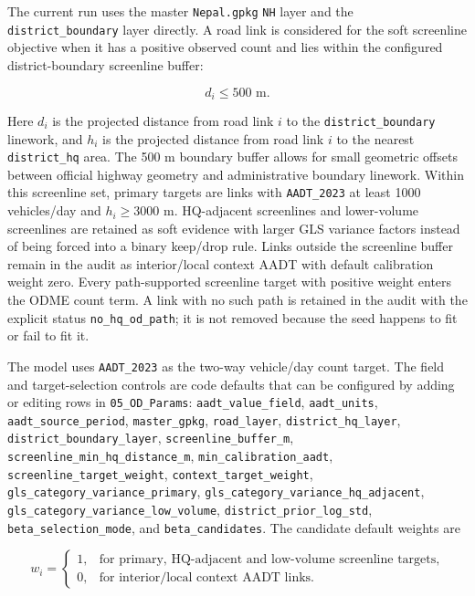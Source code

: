 \documentclass[11pt,a4paper]{article}
\begin{document}
The current run uses the master \texttt{Nepal.gpkg} \texttt{NH} layer and the
\texttt{district\_boundary} layer directly. A road link is considered for the
soft screenline objective when it has a positive observed count and lies within
the configured district-boundary screenline buffer:

\begin{equation}
d_i \leq 500\text{ m}.
\end{equation}

Here $d_i$ is the projected distance from road link $i$ to the
\texttt{district\_boundary} linework, and $h_i$ is the projected distance from
road link $i$ to the nearest \texttt{district\_hq} area. The 500 m boundary
buffer allows for small geometric offsets between official highway geometry and
administrative boundary linework. Within this screenline set, primary targets
are links with \texttt{AADT\_2023} at least 1000 vehicles/day and $h_i\geq3000$
m. HQ-adjacent screenlines and lower-volume screenlines are retained as soft
evidence with larger GLS variance factors instead of being forced into a binary
keep/drop rule. Links outside the screenline buffer remain in the audit as
interior/local context AADT with default calibration weight zero. Every
path-supported screenline target with positive weight enters the ODME count
term. A link with no such path is retained in the audit with the explicit status
\texttt{no\_hq\_od\_path}; it is not removed because the seed happens to fit
or fail to fit it.

The model uses \texttt{AADT\_2023} as the two-way vehicle/day count target.
The field and target-selection controls are code defaults that can be configured
by adding or editing rows in \texttt{05\_OD\_Params}:
\texttt{aadt\_value\_field}, \texttt{aadt\_units},
\texttt{aadt\_source\_period}, \texttt{master\_gpkg}, \texttt{road\_layer},
\texttt{district\_hq\_layer}, \texttt{district\_boundary\_layer},
\texttt{screenline\_buffer\_m}, \texttt{screenline\_min\_hq\_distance\_m},
\texttt{min\_calibration\_aadt}, \texttt{screenline\_target\_weight},
\texttt{context\_target\_weight}, \texttt{gls\_category\_variance\_primary},
\texttt{gls\_category\_variance\_hq\_adjacent},
\texttt{gls\_category\_variance\_low\_volume},
\texttt{district\_prior\_log\_std}, \texttt{beta\_selection\_mode}, and
\texttt{beta\_candidates}. The candidate default weights are

\begin{equation}
w_i=
\begin{cases}
1, & \text{for primary, HQ-adjacent and low-volume screenline targets},\\
0, & \text{for interior/local context AADT links}.
\end{cases}
\end{equation}
\end{document}
